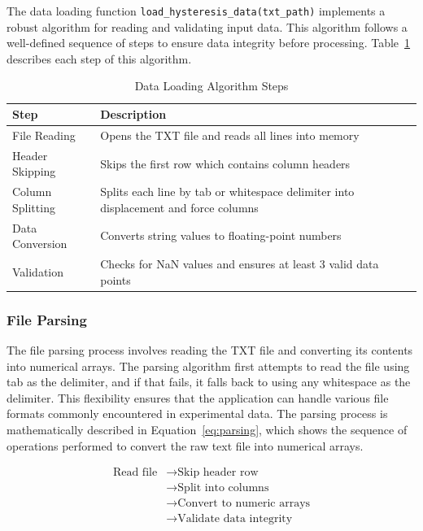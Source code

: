 \documentclass[11pt,a4paper]{article}
\begin{document}
The data loading function \texttt{load\_hysteresis\_data(txt\_path)} implements a robust algorithm for reading and validating input data. This algorithm follows a well-defined sequence of steps to ensure data integrity before processing. Table~\ref{tab:data_loading} describes each step of this algorithm.

\begin{table}[h]
\centering
\caption{Data Loading Algorithm Steps}\label{tab:data_loading}
\begin{tabular}{p{4cm}p{10cm}}
\toprule
\textbf{Step} & \textbf{Description} \\
\midrule
File Reading & Opens the TXT file and reads all lines into memory \\
Header Skipping & Skips the first row which contains column headers \\
Column Splitting & Splits each line by tab or whitespace delimiter into displacement and force columns \\
Data Conversion & Converts string values to floating-point numbers \\
Validation & Checks for NaN values and ensures at least 3 valid data points \\
\bottomrule
\end{tabular}
\end{table}

\subsubsection{File Parsing}

The file parsing process involves reading the TXT file and converting its contents into numerical arrays. The parsing algorithm first attempts to read the file using tab as the delimiter, and if that fails, it falls back to using any whitespace as the delimiter. This flexibility ensures that the application can handle various file formats commonly encountered in experimental data. The parsing process is mathematically described in Equation~\ref{eq:parsing}, which shows the sequence of operations performed to convert the raw text file into numerical arrays.

\begin{equation}
\begin{aligned}
\text{Read file} &\rightarrow \text{Skip header row} \\
&\rightarrow \text{Split into columns} \\
&\rightarrow \text{Convert to numeric arrays} \\
&\rightarrow \text{Validate data integrity}
\end{aligned}
\label{eq:parsing}
\end{equation}
\end{document}
